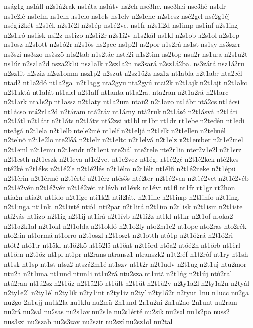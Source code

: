 {nság1g
ns1áll
n2s1á2rak
ns1áta
ns1átv
ns2ch
nsc3he.
nsc3hei
nsc3hé
ns1dr
ns1e2lé
ns1elm
ns1eln
ns1elo
ns1els
ns1elv
n2s1ene
n2s1esz
nsé2gel
nsé2g1éj
nségü2két
n2s1ék
n2s1é2l
n2s1ép
ns1é2ve.
ns1fr
n2s1i2d
ns1imp
ns1inf
n2s1ing
n2s1iró
ns1isk
nsi2z
ns1izo
n2s1í2r
n2s1í2v
n1s2kál
ns1kl
n2s1ob
n2s1ol
n2s1op
ns1osz
n2s1ott
n2s1ó2r
n2s1ös
ns2pec
ns1p2l
ns2por
n1s2rá
ns1st
ns1sy
ns3szer
ns3szi
ns3szo
ns3szö
n1s2tab
n1s2tác
nste2i
n1s2tim
ns2top
nsu2r
ns1ura
n2s1u2t
ns1úr
n2sz1a2d
nsza2k1ü
nsz1alk
n2sz1a2n
ns3zará
n2sz1á2ba.
ns3zárá
nsz1á2ru
n2sz1it
n2sziz
n2sz1omm
nsz1p2
n2szut
n2sz1ü2z
nsz1z
nt1abla
n2t1abr
nta2cél
ntad2
nt1a2dó
nt1a2ga.
n2t1agg
nta2gyu
nta2gyú
ntai2k
n2t1ajk
n2t1ajt
n2t1akc
n2t1aktá
nt1alát
nt1alel
n2t1alf
nt1anta
nt1a2ra.
nta2ran
n2t1a2rá
n2t1arc
n2t1ark
nta1s2p
nt1assz
n2t1aty
nt1a2ura
ntaü2
n2t1azo
nt1ábr
ntá2cs
nt1ácsi
nt1ácso
ntá2r1a2d
n2táram
ntá2ráv
nt1árny
ntá2ruk
n2t1ásó
n2t1ásvá
n2t1áti
n2t1átl
n2t1átr
n2t1áts
n2t1átv
ntá2zsi
nt1bl
nt1br
nt1dr
nt1ebe
n2tedén
nt1edi
nte3gá
n2t1ela
n2t1elb
ntele2mé
nt1elf
n2t1eljá
n2t1elk
n2t1ellen
n2telmél
n2telnö
n2t1e2lo
nte2lőá
n2t1elr
n2t1elto
n2t1elvá
n2t1elz
n2t1ember
n2t1e2mel
n2t1eml
n2t1emu
n2t1endr
n2t1ent
nte2rál
nte2rele
nte2r1in
nter2v1e2l
n2t1erz
n2t1esth
n2t1eszk
n2t1eva
nt1e2vet
nt1e2vez
nt1ég.
nt1é2gé
n2t1é2kek
nté2kes
nté2ké
n2t1éks
n2t1é2le
n2t1é2lés
n2t1élm
n2t1élt
nt1élű
n2t1é2neke
n2t1épü
n2t1érin
n2t1érmé
n2t1érté
n2t1érz
ntés3s
nté2ter
n2t1é2ven
n2t1é2vet
n2t1é2véb
n2t1é2vén
n2t1é2vér
n2t1é2vét
nt1évh
nt1évk
nt1évt
nt1fl
nt1fr
nt1gr
nt2hon
ntia2n
ntia2t
nt1ido
n2t1ige
nti1k2l
ntil2lát.
n2t1ille
n2t1imp
n2t1info
n2t1ing.
n2t1inga
nti1nk.
n2t1inté
ntió1
nti2par
n2t1irá
n2t1iro
n2t1isk
n2t1ism
n2t1iste
nti2vás
nt1izo
n2t1íg
n2t1íj
nt1írá
n2t1ívb
n2t1í2z
nt1kl
nt1kr
n2t1of
ntoka2
n2t1o2k1al
n2t1okl
n2t1olda
n2t1oldó
n2t1o2ly
nto2m1e2
nt1opc
nto2ras
nto2rék
nto2rin
nt1ormá
nt1orro
n2t1oszl
n2t1oszt
n2t1otth
ntó1p
n2t1ó2rá
n2t1ó2ri
ntót2
ntó1tr
nt1ökl
nt1ö2kö
nt1ö2lő
nt1önt
n2t1örd
ntőa2
ntőé2n
nt1őrb
nt1őrl
nt1őrn
n2t1őz
nt1pl
nt1pr
nt2rans
ntransz1
ntranszk2
n1t2réf
n1t2róf
nt1ry
nt1sh
nt1sk
nt1sp
nt1st
ntsz2
ntszá2m1é
nt1szv
nt1t2r
n2t1udv
n2t1ug
n2t1uj
ntu2mor
ntu2n
n2t1una
nt1und
ntun1i
nt1u2rá
ntu2sza
nt1utá
n2t1úg
n2t1új
ntú2ral
ntú2ran
nt1ú2sz
n2t1üg
n2t1ü2lő
nt1ült
n2t1üt
n2t1ü2v
n2ty1a2l
n2ty1a2n
n2tyál
n2ty1e2l
n2ty1él
n2ty1ik
n2ty1int
n2ty1iv
n2tyí
n2ty1ő2r
n2tyut
1nu
n1ucc
nu2ga
nu2go
2n1ujj
nu1k2la
nu1klu
nu2mü
2n1und
2n1u2ni
2n1u2no
2n1unt
nu2ram
nu2rá
nu2sal
nu2sas
nu2s1av
nu2s1e
nu2s1érté
nu2sik
nu2sol
nu1s2po
nuss2
nus3szi
nu2szab
nu2s3zav
nu2szir
nu2szí
nu2sz1ol
nu2tal
}
